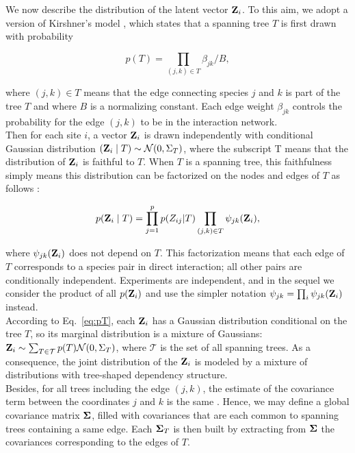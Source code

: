 \bigskip
We now describe the distribution of the latent vector ${\bf Z}_i$. To this aim, we adopt a version of Kirshner's model \citep{kirshner}, which states that a spanning tree $T$ is first drawn with probability
\begin{linenomath*}
\begin{equation} \label{eq:pT}
    p(T) = \prod_{(j, k) \in T} \beta_{jk} / B,
\end{equation}
\end{linenomath*}
where $(j, k) \in T$ means that the edge connecting species $j$ and $k$ is part of the tree $T$ and where $B$ is a normalizing constant. Each edge weight $\beta_{jk}$ controls the probability for the edge $(j, k)$ to be in the interaction network. \\
Then for each site $i$, a vector ${\bf Z}_i$ is drawn independently with conditional Gaussian distribution $({\bf Z}_i \mid T) \sim \mathcal{N}(0, \Sigma_T)$, where the subscript T means that the distribution of ${\bf Z}_i$ is {faithful} to $T$. When $T$ is a spanning tree, this faithfulness simply means this distribution can be factorized on the nodes and edges of $T$ as follows \citep[see][]{kirshner}:
\begin{linenomath*}
\begin{equation} \label{eq:pZfact}
p({\bf Z}_i \mid T) = \prod_{j=1}^p p(Z_{ij}|T) \prod_{(j, k) \in T} \psi_{jk}({\bf Z}_i),
\end{equation}
\end{linenomath*}
where $\psi_{jk}({\bf Z}_i)$ does not depend on $T$. This factorization means that each edge of $T$ corresponds to a species pair in direct interaction;  all other pairs are conditionally independent. Experiments are independent, and in the sequel we consider the product of all $p({\bf Z}_i)$ and use the simpler notation $\psi_{jk} = \prod_i \psi_{jk}({\bf Z}_i)$ instead.\\

According to Eq.~\eqref{eq:pT}, each ${\bf Z}_i$ has a Gaussian distribution conditional on the tree $T$, so its marginal distribution is a mixture of Gaussians: ${\bf Z}_i \sim \sum_{T \in\mathcal{T}} p(T) \mathcal{N}(0, \Sigma_T)$, where $\mathcal{T}$ is the set of all spanning trees. As a consequence, the joint distribution of the ${\bf Z}_i$ is modeled by a mixture of distributions with tree-shaped dependency structure. \\
Besides, for all trees including the edge $(j, k)$, the estimate of the covariance term between the coordinates $j$ and $k$ is the same \citep[see][]{Lau96,SRS19}. Hence, we may define a global covariance matrix ${\boldsymbol{\Sigma}}$, filled with covariances that are each common to spanning trees containing a same edge. Each ${\boldsymbol{\Sigma}}_T$ is then built by extracting from ${\boldsymbol{\Sigma}}$ the covariances corresponding to the edges of $T$.
